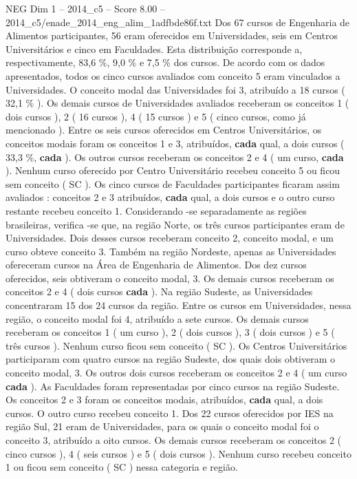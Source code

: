 \begin{textsample}{NEG Dim 1 – 2014\_c5 – Score 8.00 – 2014\_c5/enade\_2014\_eng\_alim\_1adfbde86f.txt}
Dos 67 cursos de Engenharia de Alimentos participantes, 56 eram oferecidos em Universidades, seis em Centros Universitários e cinco em Faculdades.
Esta distribuição corresponde a, respectivamente, 83,6 \%, 9,0 \% e 7,5 \% dos cursos.
De acordo com os dados apresentados, todos os cinco cursos avaliados com conceito 5 eram vinculados a Universidades.
O conceito modal das Universidades foi 3, atribuído a 18 cursos ( 32,1 \% ).
Os demais cursos de Universidades avaliados receberam os conceitos 1 ( dois cursos ), 2 ( 16 cursos ), 4 ( 15 cursos ) e 5 ( cinco cursos, como já mencionado ).
Entre os seis cursos oferecidos em Centros Universitários, os conceitos modais foram os conceitos 1 e 3, atribuídos, \textbf{cada} qual, a dois cursos ( 33,3 \%, \textbf{cada} ).
Os outros cursos receberam os conceitos 2 e 4 ( um curso, \textbf{cada} ).
Nenhum curso oferecido por Centro Universitário recebeu conceito 5 ou ficou sem conceito ( SC ).
Os cinco cursos de Faculdades participantes ficaram assim avaliados : conceitos 2 e 3 atribuídos, \textbf{cada} qual, a dois cursos e o outro curso restante recebeu conceito 1.
Considerando -se separadamente as regiões brasileiras, verifica -se que, na região Norte, os três cursos participantes eram de Universidades.
Dois desses cursos receberam conceito 2, conceito modal, e um curso obteve conceito 3.
Também na região Nordeste, apenas as Universidades ofereceram cursos na Área de Engenharia de Alimentos.
Dos dez cursos oferecidos, seis obtiveram o conceito modal, 3.
Os demais cursos receberam os conceitos 2 e 4 ( dois cursos \textbf{cada} ).
Na região Sudeste, as Universidades concentraram 15 dos 24 cursos da região.
Entre os cursos em Universidades, nessa região, o conceito modal foi 4, atribuído a sete cursos.
Os demais cursos receberam os conceitos 1 ( um curso ), 2 ( dois cursos ), 3 ( dois cursos ) e 5 ( três cursos ).
Nenhum curso ficou sem conceito ( SC ).
Os Centros Universitários participaram com quatro cursos na região Sudeste, dos quais dois obtiveram o conceito modal, 3.
Os outros dois cursos receberam os conceitos 2 e 4 ( um curso \textbf{cada} ).
As Faculdades foram representadas por cinco cursos na região Sudeste.
Os conceitos 2 e 3 foram os conceitos modais, atribuídos, \textbf{cada} qual, a dois cursos.
O outro curso recebeu conceito 1.
Dos 22 cursos oferecidos por IES na região Sul, 21 eram de Universidades, para os quais o conceito modal foi o conceito 3, atribuído a oito cursos.
Os demais cursos receberam os conceitos 2 ( cinco cursos ), 4 ( seis cursos ) e 5 ( dois cursos ).
Nenhum curso recebeu conceito 1 ou ficou sem conceito ( SC ) nessa categoria e região.

\end{textsample}
